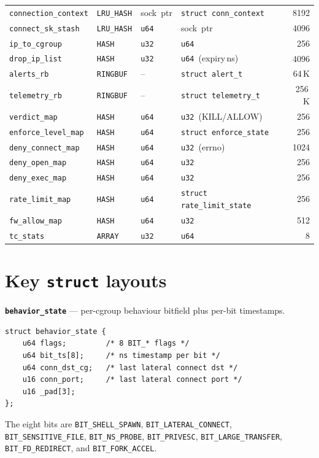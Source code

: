 \begin{table}[h]
\begin{tabular}{@{}l l l l r@{}}
\texttt{connection\_context} & \texttt{LRU\_HASH}   & sock~ptr      & \texttt{struct conn\_context}     & 8192 \\
\texttt{connect\_sk\_stash}  & \texttt{LRU\_HASH}   & \texttt{u64}  & sock~ptr                           & 4096 \\
\texttt{ip\_to\_cgroup}      & \texttt{HASH}        & \texttt{u32}  & \texttt{u64}                       & 256 \\
\texttt{drop\_ip\_list}      & \texttt{HASH}        & \texttt{u32}  & \texttt{u64}~(expiry\,ns)          & 4096 \\
\texttt{alerts\_rb}          & \texttt{RINGBUF}     & --            & \texttt{struct alert\_t}           & 64\,K \\
\texttt{telemetry\_rb}       & \texttt{RINGBUF}     & --            & \texttt{struct telemetry\_t}       & 256\,K \\
\texttt{verdict\_map}        & \texttt{HASH}        & \texttt{u64}  & \texttt{u32}~(KILL/ALLOW)          & 256 \\
\texttt{enforce\_level\_map} & \texttt{HASH}        & \texttt{u64}  & \texttt{struct enforce\_state}    & 256 \\
\texttt{deny\_connect\_map}  & \texttt{HASH}        & \texttt{u64}  & \texttt{u32}~(errno)               & 1024 \\
\texttt{deny\_open\_map}     & \texttt{HASH}        & \texttt{u64}  & \texttt{u32}                       & 256 \\
\texttt{deny\_exec\_map}     & \texttt{HASH}        & \texttt{u64}  & \texttt{u32}                       & 256 \\
\texttt{rate\_limit\_map}    & \texttt{HASH}        & \texttt{u64}  & \texttt{struct rate\_limit\_state}& 256 \\
\texttt{fw\_allow\_map}      & \texttt{HASH}        & \texttt{u64}  & \texttt{u32}                       & 512 \\
\texttt{tc\_stats}           & \texttt{ARRAY}       & \texttt{u32}  & \texttt{u64}                       & 8 \\
\bottomrule
\end{tabular}
\end{table}

\section*{Key \texttt{struct} layouts}

\textbf{\texttt{behavior\_state}} — per-cgroup behaviour bitfield plus per-bit
timestamps.
\begin{verbatim}
struct behavior_state {
    u64 flags;         /* 8 BIT_* flags */
    u64 bit_ts[8];     /* ns timestamp per bit */
    u64 conn_dst_cg;   /* last lateral connect dst */
    u16 conn_port;     /* last lateral connect port */
    u16 _pad[3];
};
\end{verbatim}
The eight bits are \texttt{BIT\_SHELL\_SPAWN}, \texttt{BIT\_LATERAL\_CONNECT},
\texttt{BIT\_SENSITIVE\_FILE}, \texttt{BIT\_NS\_PROBE},
\texttt{BIT\_PRIVESC}, \texttt{BIT\_LARGE\_TRANSFER},
\texttt{BIT\_FD\_REDIRECT}, and \texttt{BIT\_FORK\_ACCEL}.

